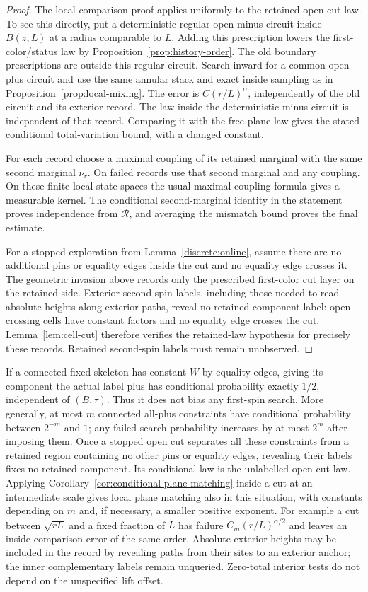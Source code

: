 \documentclass[11pt]{article}
\theoremstyle{definition}
\theoremstyle{remark}
\numberwithin{equation}{section}
\begin{document}
\begin{proof}
The local comparison proof applies uniformly to the retained open-cut law.
To see this directly, put a deterministic regular open-minus circuit inside
$B(z,L)$ at a radius comparable to $L$.  Adding this prescription lowers
the first-color/status law by Proposition~\ref{prop:history-order}.
The old boundary prescriptions are outside this regular circuit.  Search
inward for a common open-plus circuit and use the same annular stack and
exact inside sampling as in Proposition~\ref{prop:local-mixing}.  The error
is $C(r/L)^\alpha$, independently of the old circuit and its exterior
record.  The law inside the deterministic minus circuit is independent of
that record.  Comparing it with the free-plane law gives the stated
conditional total-variation bound, with a changed constant.

For each record choose a maximal coupling of its retained marginal with
the same second marginal $\nu_r$.  On failed records use that second
marginal and any coupling.  On these finite local state spaces the usual
maximal-coupling formula gives a measurable kernel.  The conditional
second-marginal identity in the statement proves independence from
$\mathcal R$, and averaging the mismatch bound proves the final estimate.

For a stopped exploration from Lemma~\ref{discrete:online}, assume there
are no additional pins or equality edges inside the cut and no equality
edge crosses it.  The geometric invasion above records only the prescribed first-color cut layer on the
retained side.  Exterior second-spin labels, including those needed to
read absolute heights along exterior paths, reveal no retained component
label: open crossing cells have constant factors and no equality edge
crosses the cut.  Lemma~\ref{lem:cell-cut} therefore verifies the retained-law
hypothesis for precisely these records.  Retained second-spin labels must
remain unobserved.
\end{proof}

If a connected fixed skeleton has constant $W$ by equality edges, giving
its component the actual label plus has conditional probability exactly
$1/2$, independent of $(B,\tau)$. Thus it does not bias any first-spin
search. More generally, at most $m$ connected all-plus constraints have
conditional probability between $2^{-m}$ and $1$; any failed-search
probability increases by at most $2^m$ after imposing them. Once a stopped
open cut separates all these constraints from a retained region containing
no other pins or equality edges, revealing their labels fixes no retained
component. Its conditional law
is the unlabelled open-cut law. Applying Corollary~\ref{cor:conditional-plane-matching}
inside a cut at an intermediate scale gives local plane
matching also in this situation, with constants depending on $m$ and,
if necessary, a smaller positive exponent. For example a cut between
$\sqrt{rL}$ and a fixed fraction of $L$ has failure
$C_m(r/L)^{\alpha/2}$ and leaves an inside comparison error of the same
order. Absolute exterior heights may be included in the record by
revealing paths from their sites to an exterior anchor; the inner
complementary labels remain unqueried. Zero-total interior tests do not depend on the unspecified lift offset.
\end{document}
